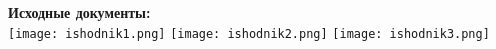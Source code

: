 \begin{center}
\Large{\textbf{Исходные документы:}}\\
\texttt{[image: ishodnik1.png]}
\newpage
\texttt{[image: ishodnik2.png]}
\newpage
\texttt{[image: ishodnik3.png]}
\end{center}